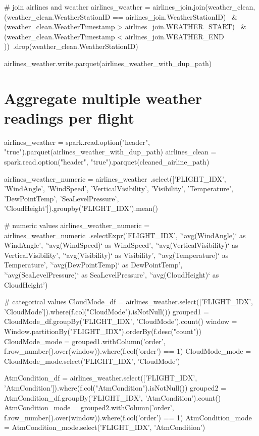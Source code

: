 \documentclass[11pt]{article}
\begin{document}
# join airlines and weather
airlines_weather = airlines_join.join(weather_clean, (weather_clean.WeatherStationID == airlines_join.WeatherStationID) \
                                      & (weather_clean.WeatherTimestamp > airlines_join.WEATHER_START) \
                                      & (weather_clean.WeatherTimestamp < airlines_join.WEATHER_END ))\
                                      .drop(weather_clean.WeatherStationID)

airlines_weather.write.parquet(airlines_weather_with_dup_path)
    \hypertarget{aggregate-multiple-weather-readings-per-flight}{%
\section{Aggregate multiple weather readings per
flight}\label{aggregate-multiple-weather-readings-per-flight}}
airlines_weather = spark.read.option("header", "true").parquet(airlines_weather_with_dup_path)
airlines_clean = spark.read.option("header", "true").parquet(cleaned_airline_path)

airlines_weather_numeric = airlines_weather\
      .select(['FLIGHT_IDX', 'WindAngle', 'WindSpeed', 'VerticalVisibility', 'Visibility', 
      'Temperature', 'DewPointTemp', 'SeaLevelPressure', 'CloudHeight']).groupby('FLIGHT_IDX').mean()

# numeric values
airlines_weather_numeric = airlines_weather_numeric\
      .selectExpr('FLIGHT_IDX', 
                  '`avg(WindAngle)` as WindAngle', 
                  '`avg(WindSpeed)` as WindSpeed', 
                  '`avg(VerticalVisibility)` as VerticalVisibility', 
                  '`avg(Visibility)` as Visibility', 
                  '`avg(Temperature)` as Temperature', 
                  '`avg(DewPointTemp)` as DewPointTemp', 
                  '`avg(SeaLevelPressure)` as SeaLevelPressure', 
                  '`avg(CloudHeight)` as CloudHeight')

# categorical values
CloudMode_df = airlines_weather.select(['FLIGHT_IDX', 'CloudMode']).where(f.col("CloudMode").isNotNull())
grouped1 = CloudMode_df.groupBy('FLIGHT_IDX', 'CloudMode').count()
window = Window.partitionBy("FLIGHT_IDX").orderBy(f.desc("count"))
CloudMode_mode = grouped1.withColumn('order', f.row_number().over(window)).where(f.col('order') == 1)
CloudMode_mode = CloudMode_mode.select('FLIGHT_IDX', 'CloudMode')

AtmCondition_df = airlines_weather.select(['FLIGHT_IDX', 'AtmCondition']).where(f.col("AtmCondition").isNotNull())
grouped2 = AtmCondition_df.groupBy('FLIGHT_IDX', 'AtmCondition').count()
AtmCondition_mode = grouped2.withColumn('order', f.row_number().over(window)).where(f.col('order') == 1)
AtmCondition_mode = AtmCondition_mode.select('FLIGHT_IDX', 'AtmCondition')
\end{document}

